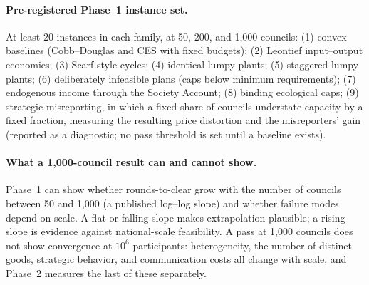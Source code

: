 \documentclass[10pt,twoside,openany]{book}
\theoremstyle{dpepstyle}
\begin{document}
\paragraph{Pre-registered Phase~1 instance set.}
At least 20 instances in each family, at 50, 200, and 1,000 councils: (1) convex baselines (Cobb--Douglas and CES with fixed budgets); (2) Leontief input--output economies; (3) Scarf-style cycles; (4) identical lumpy plants; (5) staggered lumpy plants; (6) deliberately infeasible plans (caps below minimum requirements); (7) endogenous income through the Society Account; (8) binding ecological caps; (9) strategic misreporting, in which a fixed share of councils understate capacity by a fixed fraction, measuring the resulting price distortion and the misreporters' gain (reported as a diagnostic; no pass threshold is set until a baseline exists).

\paragraph{What a 1,000-council result can and cannot show.}
Phase~1 can show whether rounds-to-clear grow with the number of councils between 50 and 1,000 (a published log--log slope) and whether failure modes depend on scale. A flat or falling slope makes extrapolation plausible; a rising slope is evidence against national-scale feasibility. A pass at 1,000 councils does not show convergence at $10^6$ participants: heterogeneity, the number of distinct goods, strategic behavior, and communication costs all change with scale, and Phase~2 measures the last of these separately.
\end{document}
